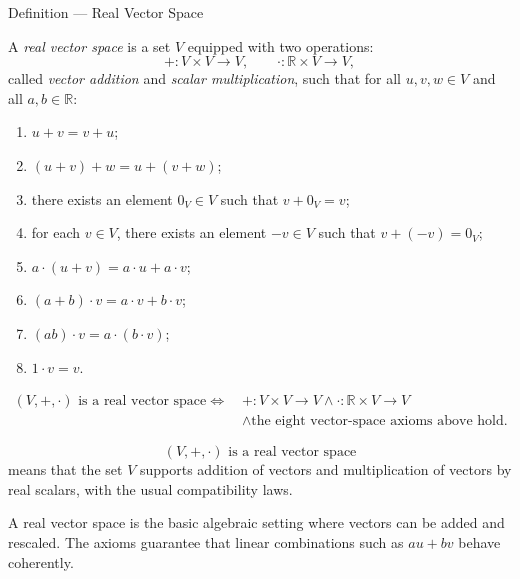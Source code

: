 \begin{definitionbox}{Definition --- Real Vector Space}
\begin{definition}\label{def:vector-spaces-real-vector-space}
A \emph{real vector space} is a set \(V\) equipped with two operations:
\[
  +:V\times V\to V,
  \qquad
  \cdot:\mathbb{R}\times V\to V,
\]
called \emph{vector addition} and \emph{scalar multiplication}, such that for
all \(u,v,w\in V\) and all \(a,b\in\mathbb{R}\):
\begin{enumerate}
  \item \(u+v=v+u\);
  \item \((u+v)+w=u+(v+w)\);
  \item there exists an element \(0_V\in V\) such that \(v+0_V=v\);
  \item for each \(v\in V\), there exists an element \(-v\in V\) such that
        \(v+(-v)=0_V\);
  \item \(a\cdot(u+v)=a\cdot u+a\cdot v\);
  \item \((a+b)\cdot v=a\cdot v+b\cdot v\);
  \item \((ab)\cdot v=a\cdot(b\cdot v)\);
  \item \(1\cdot v=v\).
\end{enumerate}
\end{definition}
\end{definitionbox}

\begin{remark*}
\[
\begin{aligned}
\text{\((V,+,\cdot)\) is a real vector space}
\Longleftrightarrow\;&
+:V\times V\to V
\land
\cdot:\mathbb{R}\times V\to V
\\
&{}\land
\text{the eight vector-space axioms above hold.}
\end{aligned}
\]
\end{remark*}

\begin{remark*}
\[
\text{\((V,+,\cdot)\) is a real vector space}
\]
means that the set \(V\) supports addition of vectors and multiplication of
vectors by real scalars, with the usual compatibility laws.
\end{remark*}

\begin{remark*}[Interpretation]
A real vector space is the basic algebraic setting where vectors can be added
and rescaled.  The axioms guarantee that linear combinations such as
\(a u+b v\) behave coherently.
\end{remark*}

